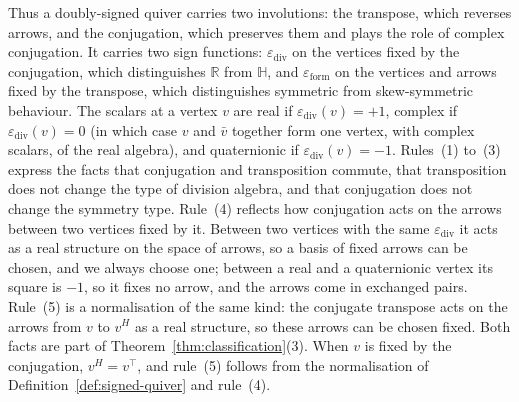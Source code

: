 \documentclass[12pt, a4paper]{report}
\theoremstyle{plain}
\theoremstyle{definition}
\theoremstyle{remark}
\theoremstyle{plain}
\newcommand{\epsilondiv}{\varepsilon_{\mathrm{div}}}
\newcommand{\epsilonform}{\varepsilon_{\mathrm{form}}}
\newcommand{\RR}{\mathbb{R}}
\newcommand{\HH}{\mathbb{H}}
\begin{document}
Thus a doubly-signed quiver carries two involutions: the transpose, which reverses arrows, and the conjugation, which preserves them and plays the role of complex conjugation. It carries two sign functions: $\epsilondiv$ on the vertices fixed by the conjugation, which distinguishes $\RR$ from $\HH$, and $\epsilonform$ on the vertices and arrows fixed by the transpose, which distinguishes symmetric from skew-symmetric behaviour. The scalars at a vertex $v$ are real if $\epsilondiv(v)=+1$, complex if $\epsilondiv(v)=0$ (in which case $v$ and $\bar v$ together form one vertex, with complex scalars, of the real algebra), and quaternionic if $\epsilondiv(v)=-1$. Rules~(1) to~(3) express the facts that conjugation and transposition commute, that transposition does not change the type of division algebra, and that conjugation does not change the symmetry type. Rule~(4) reflects how conjugation acts on the arrows between two vertices fixed by it. Between two vertices with the same $\epsilondiv$ it acts as a real structure on the space of arrows, so a basis of fixed arrows can be chosen, and we always choose one; between a real and a quaternionic vertex its square is $-1$, so it fixes no arrow, and the arrows come in exchanged pairs. Rule~(5) is a normalisation of the same kind: the conjugate transpose acts on the arrows from $v$ to $v^H$ as a real structure, so these arrows can be chosen fixed. Both facts are part of Theorem~\ref{thm:classification}(3). When $v$ is fixed by the conjugation, $v^H=v^{\top}$, and rule~(5) follows from the normalisation of Definition~\ref{def:signed-quiver} and rule~(4).
\end{document}
